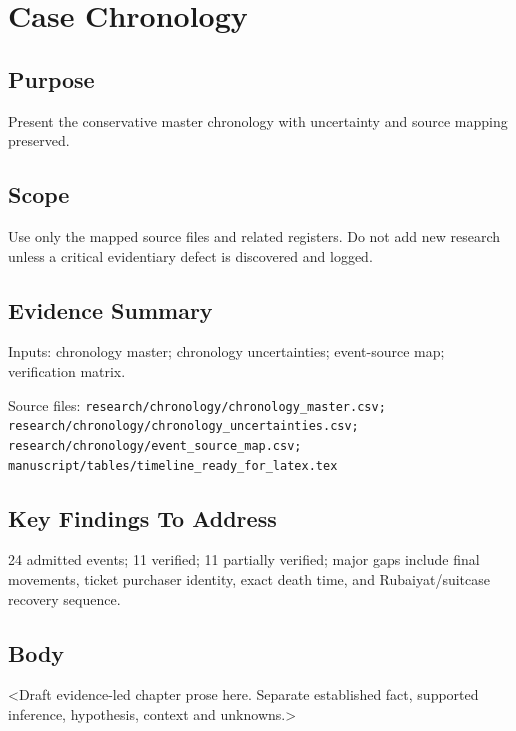 
\chapter{Case Chronology}
\label{chap:03-case-chronology}


\section{Purpose}
Present the conservative master chronology with uncertainty and source mapping preserved.

\section{Scope}
Use only the mapped source files and related registers. Do not add new research unless a critical evidentiary defect is discovered and logged.

\section{Evidence Summary}
Inputs: chronology master; chronology uncertainties; event-source map; verification matrix.

Source files: \texttt{research/chronology/chronology_master.csv; research/chronology/chronology_uncertainties.csv; research/chronology/event_source_map.csv; manuscript/tables/timeline_ready_for_latex.tex}

\section{Key Findings To Address}
24 admitted events; 11 verified; 11 partially verified; major gaps include final movements, ticket purchaser identity, exact death time, and Rubaiyat/suitcase recovery sequence.

\section{Body}
<Draft evidence-led chapter prose here. Separate established fact, supported inference, hypothesis, context and unknowns.>

